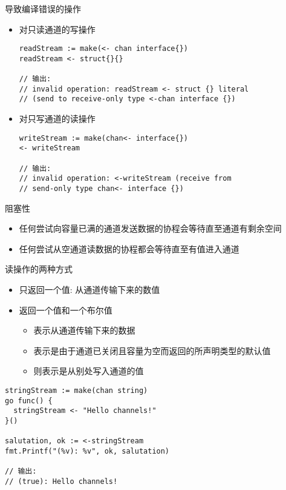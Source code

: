 \begin{frame}[fragile]{导致编译错误的操作}
\begin{itemize}
    \item 对\alert{只读通道}的写操作
\begin{lstlisting}
readStream := make(<- chan interface{})
readStream <- struct{}{}

// 输出:
// invalid operation: readStream <- struct {} literal 
// (send to receive-only type <-chan interface {})    
\end{lstlisting}
        \item\pause 对\alert{只写通道}的读操作
\begin{lstlisting}
writeStream := make(chan<- interface{})
<- writeStream

// 输出:
// invalid operation: <-writeStream (receive from 
// send-only type chan<- interface {})
\end{lstlisting}
\end{itemize}
\end{frame}

\begin{frame}{阻塞性}
    \begin{itemize}
        \item 任何尝试向容量已满的通道发送数据的协程会等待直至通道有剩余空间
        \item 任何尝试从空通道读数据的协程都会等待直至有值进入通道
    \end{itemize}
\end{frame}

\begin{frame}[fragile]{读操作的两种方式}
    \begin{itemize}
        \item 只返回一个值: 从通道传输下来的数值
        \item\pause 返回一个值和一个布尔值
            \begin{itemize}
                \item {}表示从通道传输下来的数据
                \item {}表示是由于通道已关闭且容量为空而返回的所声明类型的默认值
                \item {}则表示是从别处写入通道的值
            \end{itemize}
    \end{itemize}

\begin{lstlisting}[caption={通道的两种读取操作}]
stringStream := make(chan string)
go func() {
  stringStream <- "Hello channels!"
}()

salutation, ok := <-stringStream
fmt.Printf("(%v): %v", ok, salutation)

// 输出:
// (true): Hello channels!
\end{lstlisting}
\end{frame}

